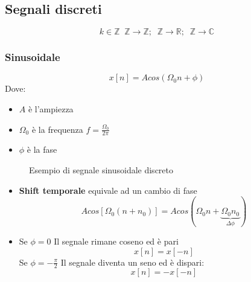 \documentclass[a4paper]{article}
\begin{document}
\subsection{Segnali discreti}
\[
k \in \mathbb{Z}\;\; \mathbb{Z} \to \mathbb{Z};\;\; \mathbb{Z} \to \mathbb{R};\;\; \mathbb{Z} \to \mathbb{C}
\] 
\subsubsection{Sinusoidale}
\[
  x[n] = A cos(\Omega_0 n + \phi)
\] 
Dove:
\begin{itemize}
  \item \( A \) è l'ampiezza
  \item \( \Omega_0 \) è la frequenza \( f = \frac{\Omega_0}{2\pi} \) 
  \item \( \phi \) è la fase
\end{itemize}
\begin{figure}[H]
  \centering
  \caption{Esempio di segnale sinusoidale discreto}
\end{figure}

\begin{itemize}
  \item \textbf{Shift temporale} equivale ad un cambio di fase
    \[
      A cos[\Omega_0 (n + n_0)] = A cos(\Omega_0 n + \underbrace{\Omega_0 n_0}_{\Delta \phi})
    \] 

  \item Se \( \phi = 0 \) Il segnale rimane coseno ed è pari
    \[
      x[n] = x[-n]
    \] 
    Se \( \phi = -\frac{\pi}{2} \) Il segnale diventa un seno ed è dispari:
    \[
      x[n] = -x[-n]
    \] 
\end{itemize}
\end{document}
